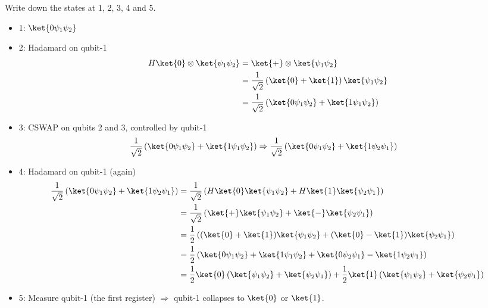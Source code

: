 \documentclass[12pt]{exam}
\begin{document}
\begin{questions}
Write down the states at 1, 2, 3, 4 and 5.

\begin{solution}
  \begin{itemize}
\item 1: $\ket{0 \psi_1 \psi_2}$
\item 2: Hadamard on qubit-1
  \begin{align*}
H\ket{0} \otimes \ket{\psi_1 \psi_2}
  &=
  \ket{+} \otimes \ket{\psi_1 \psi_2} \\
  &=
  \frac{1}{\sqrt{2}}\left( \ket{0} + \ket{1} \right) \ket{\psi_1 \psi_2} \\
  &=
  \frac{1}{\sqrt{2}}\left( \ket{0\psi_1 \psi_2} + \ket{1\psi_1 \psi_2} \right) \\
  \end{align*}
\item 3: CSWAP on qubits 2 and 3, controlled by qubit-1
  \begin{align*}
\frac{1}{\sqrt{2}}\left( \ket{0\psi_1 \psi_2} + \ket{1\psi_1 \psi_2} \right)
  &\Rightarrow
\frac{1}{\sqrt{2}}\left( \ket{0\psi_1 \psi_2} + \ket{1\psi_2 \psi_1} \right)
  \end{align*}
\item 4: Hadamard on qubit-1 (again)
  \begin{align*}
\frac{1}{\sqrt{2}}\left( \ket{0\psi_1 \psi_2} + \ket{1\psi_2 \psi_1} \right)
    &=
\frac{1}{\sqrt{2}}
  \left(
      H\ket{0}\ket{\psi_1 \psi_2}
      +
      H\ket{1}\ket{\psi_2 \psi_1}
  \right) \\
    &=
\frac{1}{\sqrt{2}}
  \left(
      \ket{+}\ket{\psi_1 \psi_2}
      +
      \ket{-}\ket{\psi_2 \psi_1}
  \right) \\
    &=
\frac{1}{2}
  \left(
      (\ket{0}+\ket{1})\ket{\psi_1 \psi_2}
      +
      (\ket{0}-\ket{1})\ket{\psi_2 \psi_1}
  \right) \\
    &=
\frac{1}{2}
  \left(
        \ket{0\psi_1 \psi_2}
      + \ket{1\psi_1 \psi_2}
      + \ket{0\psi_2 \psi_1}
      - \ket{1\psi_2 \psi_1}
  \right) \\
    &=
\frac{1}{2}\ket{0}
  \left(
    \ket{\psi_1 \psi_2} + \ket{\psi_2 \psi_1}
  \right)
+
\frac{1}{2}\ket{1}
  \left(
    \ket{\psi_1 \psi_2} + \ket{\psi_2 \psi_1}
  \right)
  \end{align*}
\item 5: Measure qubit-1 (the first register) $\Rightarrow$
  qubit-1 collapses to $\ket{0}$ or $\ket{1}$.
  \end{itemize}
\end{solution}


\end{questions}
\end{document}

